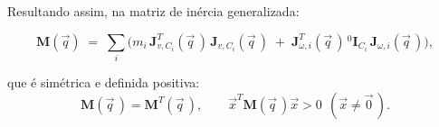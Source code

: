 Resultando assim, na matriz de inércia generalizada:

\begin{equation}
\label{eq:definicao_Mq}
\mathbf M(\vec q)
\;=\;
\sum_i \Big(m_i\,\mathbf J_{v,C_i}^{T}(\vec q\,)\,\mathbf J_{v,C_i}(\vec q\, ) \;+\; \mathbf J_{\omega,i}^{T}(\vec q\, )\,{}^{0}\!\mathbf I_{C_i}\,\mathbf J_{\omega,i}(\vec q\, )\Big),
\end{equation}

que é simétrica e definida positiva:
\begin{equation}
\mathbf M(\vec q\, )=\mathbf M^{T}(\vec q\, ), 
\qquad
\vec x^{T}\mathbf M(\vec q\, )\vec x>0 \ \ (\vec x\neq \vec 0\, ).
\end{equation}